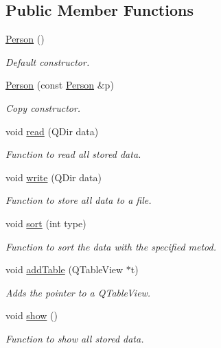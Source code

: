 \subsection*{Public Member Functions}
\begin{DoxyCompactItemize}
\item 
\hyperlink{class_person_a0397c6f89fafc12e738923f612bc41a3}{Person} ()
\begin{DoxyCompactList}\small\item\em Default constructor. \end{DoxyCompactList}\item 
\hyperlink{class_person_a847845e2e214a89e790c584678f1ea97}{Person} (const \hyperlink{class_person}{Person} \&p)
\begin{DoxyCompactList}\small\item\em Copy constructor. \end{DoxyCompactList}\item 
void \hyperlink{class_person_a98c73f33a51b80cc9296a949f2fc5cf3}{read} (Q\+Dir data)
\begin{DoxyCompactList}\small\item\em Function to read all stored data. \end{DoxyCompactList}\item 
void \hyperlink{class_person_aa667ce32c0552e818ac6df14c9a5f50d}{write} (Q\+Dir data)
\begin{DoxyCompactList}\small\item\em Function to store all data to a file. \end{DoxyCompactList}\item 
void \hyperlink{class_person_a602ce88a8ef959c3f4044d9dc00dd2cf}{sort} (int type)
\begin{DoxyCompactList}\small\item\em Function to sort the data with the specified metod. \end{DoxyCompactList}\item 
void \hyperlink{class_person_a100215914f651662a6207722ef28769e}{add\+Table} (Q\+Table\+View $\ast$t)
\begin{DoxyCompactList}\small\item\em Adds the pointer to a Q\+Table\+View. \end{DoxyCompactList}\item 
void \hyperlink{class_person_a2f1231629a6e7e8c83ada57628e80a89}{show} ()
\begin{DoxyCompactList}\small\item\em Function to show all stored data. \end{DoxyCompactList}\end{DoxyCompactItemize}
